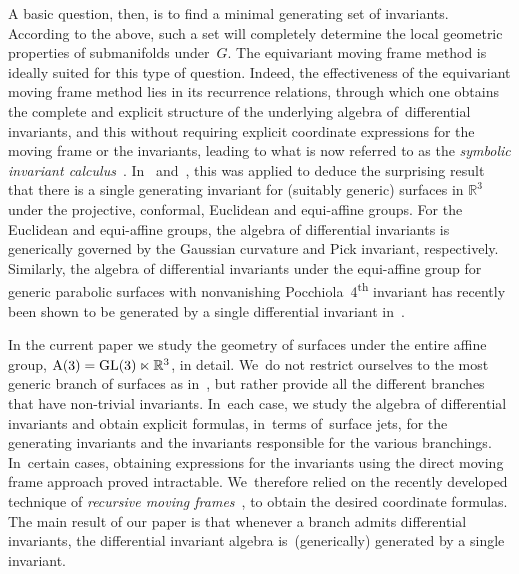 \documentclass[10pt,a4paper]{amsart}
\numberwithin{equation}{section}
\newcommand{\R}{\mathbb{R}}
\begin{document}
A basic question, then, is to find a minimal generating set of invariants. According to the above, such a set will completely determine the local geometric properties of submanifolds under~$G$. The equivariant moving frame method is ideally suited for this type of question. Indeed, the effectiveness of the equivariant moving frame method lies in its recurrence relations, through which one obtains the complete and explicit structure of the underlying algebra of~differential invariants, and this without requiring explicit coordinate expressions for the moving frame or the invariants, leading to what is now referred to as the \emph{symbolic invariant calculus}~\cite{M-2010}. In~\cite{HO-2007} and~\cite{O-2009diff}, this was applied to deduce the surprising result that there is a single generating invariant for (suitably generic) surfaces in $\R^3$ under the projective, conformal, Euclidean and equi-affine groups. For the Euclidean and equi-affine groups, the algebra of differential invariants is generically governed by the Gaussian curvature and Pick invariant, respectively. Similarly, the algebra of differential invariants under the equi-affine group for generic parabolic surfaces with nonvanishing Pocchiola~4\textsuperscript{th} invariant has recently been shown to be generated by a single differential invariant in~\cite{CM-2020}.

In the current paper we study the geometry of surfaces under the entire affine group, ${\rm A}(3)={\rm GL}(3)\ltimes \R^3$, in detail. We~do not restrict ourselves to the most generic branch of surfaces as \mbox{in~\cite{HO-2007, O-2009diff}}, but rather provide all the different branches that have non-trivial invariants. In~each case, we study the algebra of differential invariants and obtain explicit formulas, in~terms of~surface jets, for the generating invariants and the invariants responsible for the various bran\-chings. In~certain cases, obtaining expressions for the invariants using the direct moving frame approach proved intractable. We~therefore relied on the recently developed technique of \emph{recursive moving frames}~\cite{O-2011}, to obtain the desired coordinate formulas. The main result of our paper is that whenever a branch admits differential invariants, the differential invariant algebra is~(gene\-rically) generated by a single invariant.
\end{document}
